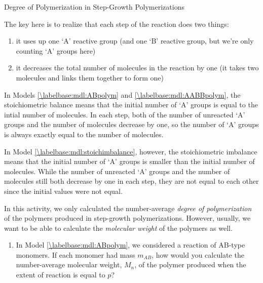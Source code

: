 \begin{activity}{Degree of Polymerization in Step-Growth Polymerizations}
\begin{exercises}
\begin{solution}
{				The key here is to realize that each step of the reaction does two things:
				\begin{enumerate}
					\item it uses up one `A' reactive group (and one `B' reactive group, but we're only counting `A' groups here)
					\item it decreases the total number of molecules in the reaction by one (it takes two molecules and links them together to form one)
				\end{enumerate}
				In Models \ref{\labelbase:mdl:ABpolym} and \ref{\labelbase:mdl:AABBpolym}, the stoichiometric balance means that the initial number of `A' groups is equal to the intial number of molecules.
				In each step, both of the number of unreacted `A' groups and the number of molecules decrease by one, so the number of `A' groups is always exactly equal to the number of molecules.
				
				In Model \ref{\labelbase:mdl:stoichimbalance}, however, the stoichiometric imbalance means that the initial number of `A' groups is smaller than the initial number of molecules.
				While the number of unreacted `A' groups and the number of molecules still both decrease by one in each step, they are not equal to each other since the initial values were not equal.}
				
			\end{solution}
	
		\exercise In this activity, we only calculated the number-average \emph{degree of polymerization} of the polymers produced in step-growth polymerizations. However, usually, we want to be able to calculate the \emph{molecular weight} of the polymers as well.
		
			\begin{enumerate}
			
				\item In Model \ref{\labelbase:mdl:ABpolym}, we considered a reaction of AB-type monomers.  If each monomer had mass $m_{AB}$, how would you calculate the number-average molecular weight, $M_n$, of the polymer produced when the extent of reaction is equal to $p$?
				
					\begin{solution}
\end{solution}
\end{enumerate}
\end{exercises}
\end{activity}
